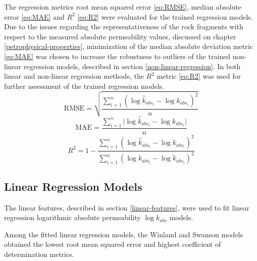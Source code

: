 \documentclass[english,msc,numbers]{coppe}
\begin{document}
  The regression metrics root mean squared error \eqref{eq:RMSE}, median absolute error \eqref{eq:MAE} and \(R^2\) \eqref{eq:R2} were evaluated for the trained regression models. Due to the issues regarding the representativeness of the rock fragments with respect to the measured absolute permeability values, discussed on chapter \ref{petrophysical-properties}, minimization of the median absolute deviation metric \eqref{eq:MAE} was chosen to increase the robustness to outliers of the trained non-linear regression models, described in section \ref{non-linear-regression}. In both linear and non-linear regression methods, the \(R^2\) metric \eqref{eq:R2} was used for further assessment of the trained regression models.
  \begin{equation} 
    \text{RMSE} = \sqrt{\frac{\sum_{i=1}^n{(\log{\hat{k}_{{abs}_i}}-\log{k_{{abs}_i}})^2}}{n}}
    \label{eq:RMSE}
  \end{equation}
  \begin{equation} 
    \text{MAE} = \frac{\sum_{i=1}^n{|\log{\hat{k}_{{abs}_i}}-\log{k_{{abs}_i}}}|}{n}
    \label{eq:MAE}
  \end{equation}
  \begin{equation} 
    R^2 = 1-\frac{\sum_{i=1}^n{(\log{\hat{k}_{{abs}_i}}-\log{k_{{abs}_i}})^2}}{\sum_{i=1}^n{(\log{k_{{abs}_i}}-\overline{\log{k_{{abs}_i}}})^2}}
    \label{eq:R2}
  \end{equation}
  \hypertarget{linear-regression-models}{%
  \subsection{Linear Regression Models}\label{linear-regression-models}}
  
  The linear features, described in section \ref{linear-features}, were used to fit linear regression logarithmic absolute permeability \(\log{k_{abs}}\) models.
  
  Among the fitted linear regression models, the Winland and Swanson models obtained the lowest root mean squared error and highest coefficient of determination metrics.
  
\end{document}
